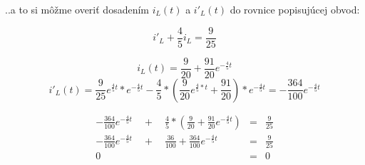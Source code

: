 ..a to si môžme overiť dosadením  $i_L(t)$ a $i'_L(t)$ do rovnice popisujúcej obvod:

$$i'_L+\frac{4}{5}i_L=\frac{9}{25}$$

\vspace{0.5cm}
$$ i_L(t)=\frac{9}{20}+\frac{91}{20}e^{-\frac{4}{5}t}$$
$$i'_L(t)= \frac{9}{25}e^{\frac{4}{5}t}*e^{-\frac{4}{5}t}-\frac{4}{5}*(\frac{9}{20}e^{\frac{4}{5}*t}+\frac{91}{20})*e^{-\frac{4}{5}t}=-\frac{364}{100}e^{-\frac{4}{5}t}$$

\vspace{0.5cm}
\begin{eqnarray*}
 -\frac{364}{100}e^{-\frac{4}{5}t}\quad+\quad\frac{4}{5}*(\frac{9}{20}+\frac{91}{20}e^{-\frac{4}{5}t}) &=& \frac{9}{25}
 \\
 -\frac{364}{100}e^{-\frac{4}{5}t}\quad+\quad\frac{36}{100}+\frac{364}{100}e^{-\frac{4}{5}t} &=& \frac{9}{25}
 \\
 0 &=& 0
\end{eqnarray*}